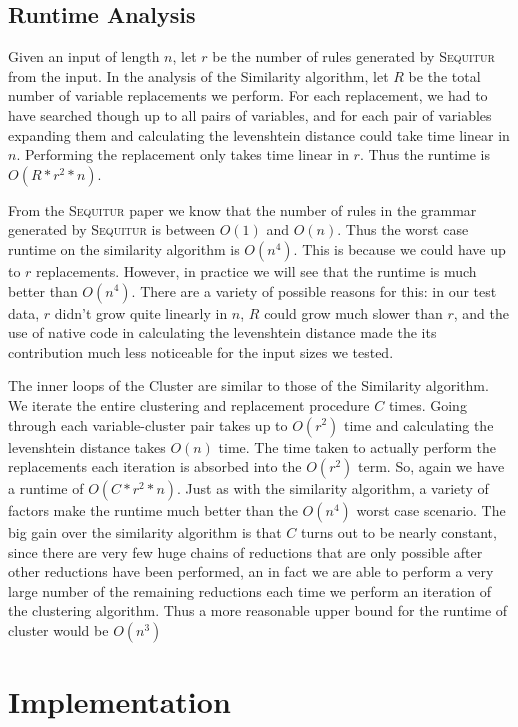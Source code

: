 \documentclass[11pt]{article}
\newcommand{\Sequitur}{\textsc{Sequitur}\xspace}
\begin{document}
\subsection{Runtime Analysis}

Given an input of length $n$, let $r$ be the number of rules generated by
\Sequitur from the input.  In the analysis of the Similarity algorithm, let $R$
be the total number of variable replacements we perform. For each replacement,
we had to have searched though up to all pairs of variables, and for each pair
of variables expanding them and calculating the levenshtein distance could take
time linear in $n$.  Performing the replacement only takes time linear in $r$.
Thus the runtime is $\boxed{O(R*r^2*n)}$.

From the \Sequitur paper \cite{sequitur} we know that the number of rules in
the grammar generated by \Sequitur is between $O(1)$ and $O(n)$. Thus the worst
case runtime on the similarity algorithm is $\boxed{O(n^4)}$. This is because
we could have up to $r$ replacements.  However, in practice we will see that
the runtime is much better than $O(n^4)$. There are a variety of possible
reasons for this: in our test data, $r$ didn't grow quite linearly in $n$, $R$
could grow much slower than $r$, and the use of native code in calculating the
levenshtein distance made the its contribution much less noticeable for the
input sizes we tested.

The inner loops of the Cluster are similar to those of the Similarity
algorithm.  We iterate the entire clustering and replacement procedure $C$
times. Going through each variable-cluster pair takes up to $O(r^2)$ time and
calculating the levenshtein distance takes $O(n)$ time. The time taken to
actually perform the replacements each iteration is absorbed into the $O(r^2)$
term. So, again we have a runtime of $\boxed{O(C*r^2*n)}$. Just as with the
similarity algorithm, a variety of factors make the runtime much better than
the $\boxed{O(n^4)}$ worst case scenario.  The big gain over the similarity
algorithm is that $C$ turns out to be nearly constant, since there are very few
huge chains of reductions that are only possible after other reductions have
been performed, an in fact we are able to perform a very large number of the
remaining reductions each time we perform an iteration of the clustering
algorithm. Thus a more reasonable upper bound for the runtime of cluster would
be $\boxed{O(n^3)}$

\section{Implementation}
\end{document}
